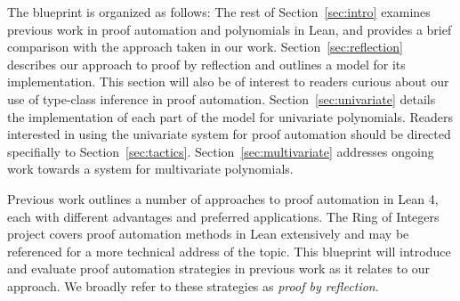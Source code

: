%

\label{sec:intro}


The blueprint is organized as follows: The rest of Section~\ref{sec:intro} examines previous work in proof automation and polynomials in Lean, and provides a brief comparison with the approach taken in our work. Section~\ref{sec:reflection} describes our approach to proof by reflection and outlines a model for its implementation. This section will also be of interest to readers curious about our use of type-class inference in proof automation. Section~\ref{sec:univariate} details the implementation of each part of the model for univariate polynomials. Readers interested in using the univariate system for proof automation should be directed specifially to Section~\ref{sec:tactics}. Section~\ref{sec:multivariate} addresses ongoing work towards a system for multivariate polynomials.

\label{sec:automation}

Previous work outlines a number of approaches to proof automation in Lean 4, each with different advantages and preferred applications. The Ring of Integers project \cite{RingOfIntegers2025} covers proof automation methods in Lean extensively and may be referenced for a more technical address of the topic. This blueprint will introduce and evaluate proof automation strategies in previous work as it relates to our approach. We broadly refer to these strategies as \emph{proof by reflection}.

